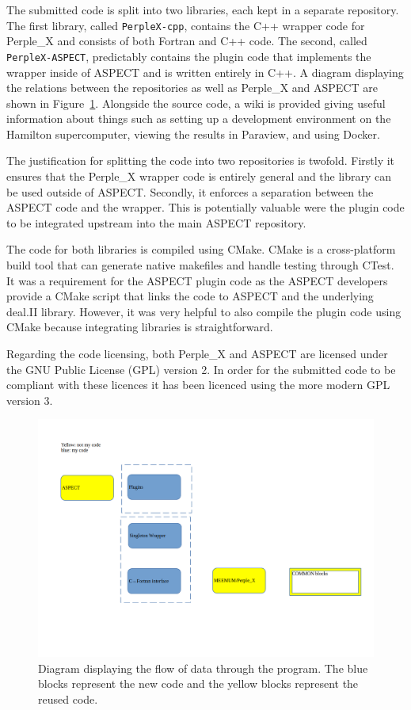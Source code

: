 The submitted code is split into two libraries, each kept in a separate repository.
The first library, called \texttt{PerpleX-cpp}, contains the C++ wrapper code for Perple\_X and consists of both Fortran and C++ code.
The second, called \texttt{PerpleX-ASPECT}, predictably contains the plugin code that implements the wrapper inside of ASPECT and is written entirely in C++.
A diagram displaying the relations between the repositories as well as Perple\_X and ASPECT are shown in Figure~\ref{fig:dataflow}.
Alongside the source code, a wiki is provided giving useful information about things such as setting up a development environment on the Hamilton supercomputer, viewing the results in Paraview, and using Docker.

The justification for splitting the code into two repositories is twofold.
Firstly it ensures that the Perple\_X wrapper code is entirely general and the library can be used outside of ASPECT.
Secondly, it enforces a separation between the ASPECT code and the wrapper.
This is potentially valuable were the plugin code to be integrated upstream into the main ASPECT repository.

The code for both libraries is compiled using CMake.
CMake is a cross-platform build tool that can generate native makefiles and handle testing through CTest.
It was a requirement for the ASPECT plugin code as the ASPECT developers provide a CMake script that links the code to ASPECT and the underlying deal.II library.
However, it was very helpful to also compile the plugin code using CMake because integrating libraries is straightforward.

Regarding the code licensing, both Perple\_X and ASPECT are licensed under the GNU Public License (GPL) version 2.
In order for the submitted code to be compliant with these licences it has been licenced using the more modern GPL version 3.

\begin{figure}[ht]
    \centering
    \includegraphics[width=\textwidth]{figures/dataflow.png}
    \caption{Diagram displaying the flow of data through the program. The blue blocks represent the new code and the yellow blocks represent the reused code.}
    \label{fig:dataflow}
\end{figure}

